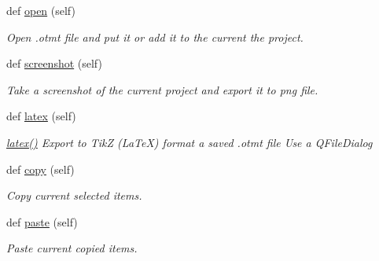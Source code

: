 \begin{DoxyCompactItemize}
\mbox{\label{classInterface_1_1Window_a408603b2145e2d945a482171a97b9916}} 
def \mbox{\hyperlink{classInterface_1_1Window_a408603b2145e2d945a482171a97b9916}{open}} (self)
\begin{DoxyCompactList}\small\item\em Open .otmt file and put it or add it to the current the project. \end{DoxyCompactList}\item 
\mbox{\label{classInterface_1_1Window_ad7e7d3c00b5e18685ba9ea7f8b9ce1c5}} 
def \mbox{\hyperlink{classInterface_1_1Window_ad7e7d3c00b5e18685ba9ea7f8b9ce1c5}{screenshot}} (self)
\begin{DoxyCompactList}\small\item\em Take a screenshot of the current project and export it to png file. \end{DoxyCompactList}\item 
\mbox{\label{classInterface_1_1Window_ab1ac7ed851d9be8803d2de568c0d1f14}} 
def \mbox{\hyperlink{classInterface_1_1Window_ab1ac7ed851d9be8803d2de568c0d1f14}{latex}} (self)
\begin{DoxyCompactList}\small\item\em \mbox{\hyperlink{classInterface_1_1Window_ab1ac7ed851d9be8803d2de568c0d1f14}{latex()}} Export to TikZ (La\+TeX) format a saved .otmt file Use a Q\+File\+Dialog \end{DoxyCompactList}\item 
\mbox{\label{classInterface_1_1Window_ab42b2836926d34abdd3eb93d65a76479}} 
def \mbox{\hyperlink{classInterface_1_1Window_ab42b2836926d34abdd3eb93d65a76479}{copy}} (self)
\begin{DoxyCompactList}\small\item\em Copy current selected items. \end{DoxyCompactList}\item 
\mbox{\label{classInterface_1_1Window_a2be7a697b8fc108b7b218cb43fd03ad1}} 
def \mbox{\hyperlink{classInterface_1_1Window_a2be7a697b8fc108b7b218cb43fd03ad1}{paste}} (self)
\begin{DoxyCompactList}\small\item\em Paste current copied items. \end{DoxyCompactList}\item 

\end{DoxyCompactItemize}
